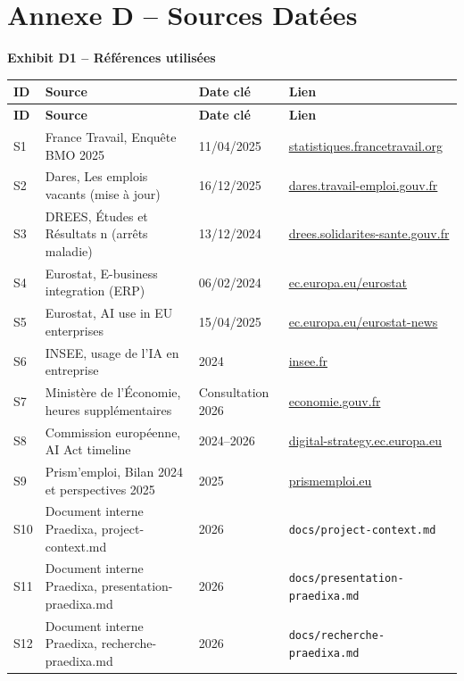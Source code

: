 \documentclass[11pt,a4paper]{article}
\newcommand{\exhibit}[1]{\vspace{2mm}\noindent\colorbox{PraedixaLight}{\parbox{\dimexpr\linewidth-2\fboxsep\relax}{\textbf{#1}}}\vspace{1mm}}
\begin{document}
\section{Annexe D -- Sources Datées}
\exhibit{Exhibit D1 -- Références utilisées}
\small
\begin{longtable}{@{}p{1cm}p{5.2cm}p{2.4cm}p{6.4cm}@{}}
\toprule
\textbf{ID} & \textbf{Source} & \textbf{Date clé} & \textbf{Lien} \\
\midrule
\endfirsthead
\toprule
\textbf{ID} & \textbf{Source} & \textbf{Date clé} & \textbf{Lien} \\
\midrule
\endhead
S1 & France Travail, Enquête BMO 2025 & 11/04/2025 & \href{https://statistiques.francetravail.org/bmo/bmopub/225146}{statistiques.francetravail.org} \\
S2 & Dares, Les emplois vacants (mise à jour) & 16/12/2025 & \href{https://dares.travail-emploi.gouv.fr/donnees/les-emplois-vacants}{dares.travail-emploi.gouv.fr} \\
S3 & DREES, Études et Résultats n\textdegree1321 (arrêts maladie) & 13/12/2024 & \href{https://www.drees.solidarites-sante.gouv.fr/publications-communique-de-presse/etudes-et-resultats/241211_ER_Arrets-Maladie}{drees.solidarites-sante.gouv.fr} \\
S4 & Eurostat, E-business integration (ERP) & 06/02/2024 & \href{https://ec.europa.eu/eurostat/documents/2995521/18404397/4-06022024-AP-EN.pdf}{ec.europa.eu/eurostat} \\
S5 & Eurostat, AI use in EU enterprises & 15/04/2025 & \href{https://ec.europa.eu/eurostat/web/products-eurostat-news/w/ddn-20250415-1}{ec.europa.eu/eurostat-news} \\
S6 & INSEE, usage de l'IA en entreprise & 2024 & \href{https://www.insee.fr/fr/statistiques/8232138}{insee.fr} \\
S7 & Ministère de l'Économie, heures supplémentaires & Consultation 2026 & \href{https://www.economie.gouv.fr/particuliers/heures-supplementaires-salaries-prive}{economie.gouv.fr} \\
S8 & Commission européenne, AI Act timeline & 2024--2026 & \href{https://digital-strategy.ec.europa.eu/en/policies/regulatory-framework-ai}{digital-strategy.ec.europa.eu} \\
S9 & Prism'emploi, Bilan 2024 et perspectives 2025 & 2025 & \href{https://www.prismemploi.eu/publication/bilan-2024-perspectives-2025/}{prismemploi.eu} \\
S10 & Document interne Praedixa, project-context.md & 2026 & \texttt{docs/project-context.md} \\
S11 & Document interne Praedixa, presentation-praedixa.md & 2026 & \texttt{docs/presentation-praedixa.md} \\
S12 & Document interne Praedixa, recherche-praedixa.md & 2026 & \texttt{docs/recherche-praedixa.md} \\
\bottomrule
\end{longtable}
\normalsize
\end{document}
